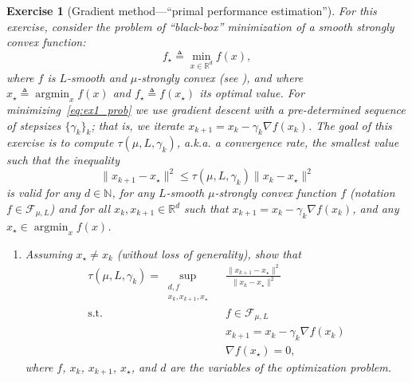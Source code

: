 \documentclass[11pt,a4paper]{article}
\DeclareMathOperator*{\argmin}{argmin}
\newtheorem{exercise}{Exercise}
\begin{document}
	
	\begin{exercise}[Gradient method---``primal performance estimation'']\label{ex1} For this exercise, consider the problem of ``black-box'' minimization of a smooth strongly convex function:
	\begin{equation}\label{eq:ex1_prob}
	f_\star \triangleq \min_{x\in\mathbb{R}^d} f(x),
	\end{equation}
	where $f$ is $L$-smooth and $\mu$-strongly convex (see ), and where $x_\star\triangleq \argmin_{x} f(x)$ and $f_\star\triangleq f(x_\star)$ its optimal value. For minimizing~\eqref{eq:ex1_prob} we use gradient descent with a pre-determined sequence of stepsizes $\{\gamma_k\}_k$; that is, we iterate $x_{k+1}=x_k-\gamma_k \nabla f(x_k)$.
	The goal of this exercise is to compute $\tau(\mu,L,\gamma_k)$, a.k.a.\! a convergence rate, the smallest value such that the inequality
	\begin{equation}\label{ex1:eq:distance}
	 \|x_{k+1}-x_\star\|^2 \leqslant \tau(\mu,L,\gamma_k) \|x_k-x_\star\|^2
	\end{equation}
	is valid for any $d\in\mathbb{N}$, for any $L$-smooth $\mu$-strongly convex function $f$ (notation $f\in\mathcal{F}_{\mu,L}$) and for all $x_k,x_{k+1}\in\mathbb{R}^d$ such that $x_{k+1}=x_k-\gamma_k \nabla f(x_k)$, and any $x_\star\in\argmin_x f(x)$. 
	\begin{enumerate}
	\item Assuming $x_\star\neq x_k$ (without loss of generality), show that 
	\begin{equation}\label{ex1:eq:base_pep1}
	\begin{aligned}
		\tau(\mu,L,\gamma_k)= \sup_{\substack{d,f\\x_k,x_{k+1},x_\star}} \ &\frac{\|x_{k+1}-x_\star\|^2}{\|x_k-x_\star\|^2}\\
		\text{s.t. } & f\in\mathcal{F}_{\mu,L} \\
		&x_{k+1}=x_k-\gamma_k  \nabla f(x_k)\\
		&\nabla f(x_\star)=0,
		\end{aligned}
	\end{equation} where $f$, $x_k$, $x_{k+1}$, $x_\star$, and $d$ are the variables of the optimization problem.
		

\end{enumerate}
\end{exercise}
\end{document}
